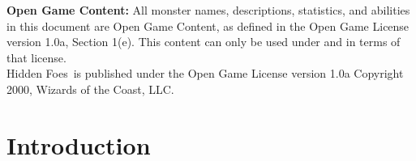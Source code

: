 \documentclass[letterpaper, 12pt, twocolumn]{article}
\title{\projecttitle}
\author{Alex Gestwicki}
\def\projecttitle{Hidden Foes}
\begin{document}
\maketitle
\RaggedRight
\clearpage
\textbf{Open Game Content:} All monster names, descriptions, statistics, and abilities in this document are Open Game Content, as
defined in the Open Game License version 1.0a, Section 1(e). This content can only be used under and in terms of that license.
\\\bigskip
\projecttitle\ is published under the Open Game License version 1.0a Copyright 2000, Wizards of the Coast, LLC.
\newpage
\tableofcontents
\clearpage
\section*{Introduction}
\clearpage


\clearpage


\clearpage


\clearpage

\end{document}
